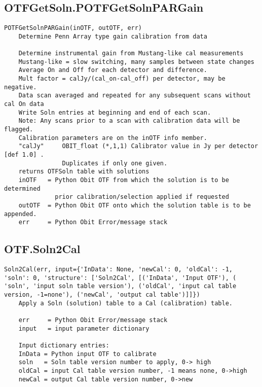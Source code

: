 \documentclass[11pt]{report}
\begin{document}
\subsection{OTFGetSoln.POTFGetSolnPARGain}
\begin{verbatim}
POTFGetSolnPARGain(inOTF, outOTF, err)
    Determine Penn Array type gain calibration from data
    
    Determine instrumental gain from Mustang-like cal measurements
    Mustang-like = slow switching, many samples between state changes
    Average On and Off for each detector and difference.
    Mult factor = calJy/(cal_on-cal_off) per detector, may be negative.
    Data scan averaged and repeated for any subsequent scans without cal On data
    Write Soln entries at beginning and end of each scan.
    Note: Any scans prior to a scan with calibration data will be flagged.
    Calibration parameters are on the inOTF info member.
    "calJy"     OBIT_float (*,1,1) Calibrator value in Jy per detector [def 1.0] .
                Duplicates if only one given.
    returns OTFSoln table with solutions
    inOTF   = Python Obit OTF from which the solution is to be determined
              prior calibration/selection applied if requested
    outOTF  = Python Obit OTF onto which the solution table is to be appended.
    err     = Python Obit Error/message stack
\end{verbatim}

\subsection{OTF.Soln2Cal}
\begin{verbatim}
Soln2Cal(err, input={'InData': None, 'newCal': 0, 'oldCal': -1, 'soln': 0, 'structure': ['Soln2Cal', [('InData', 'Input OTF'), (
'soln', 'input soln table version'), ('oldCal', 'input cal table version, -1=none'), ('newCal', 'output cal table')]]})
    Apply a Soln (solution) table to a Cal (calibration) table.
    
    err     = Python Obit Error/message stack
    input   = input parameter dictionary
    
    Input dictionary entries:
    InData = Python input OTF to calibrate
    soln   = Soln table version number to apply, 0-> high
    oldCal = input Cal table version number, -1 means none, 0->high
    newCal = output Cal table version number, 0->new
\end{verbatim}
\end{document}
